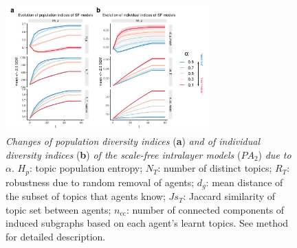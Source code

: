 \begin{figure}
    \centering
    \includegraphics[width=0.7\textwidth,center]{../figures/report/Fig3.pdf}
    \caption{\label{fig:3}
    \textit{Changes of population diversity indices} (\textbf{a}) \textit{and of individual diversity indices} (\textbf{b}) \textit{of the scale-free intralayer models} ($PA_2$) \textit{due to} $\alpha$. $H_p$: topic population entropy; $N_T$: number of distinct topics; $R_T$: robustness due to random removal of agents; $d_g$: mean distance of the subset of topics that agents know; $Js_T$: Jaccard similarity of topic set between agents; $n_{\mathrm{cc}}$: number of connected components of induced subgraphs based on each agent's learnt topics. See method for detailed description.
    }
\end{figure}
